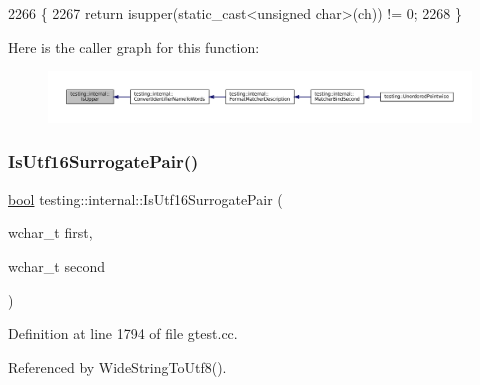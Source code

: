 \begin{DoxyCode}
2266                              \{
2267   \textcolor{keywordflow}{return} isupper(static\_cast<unsigned char>(ch)) != 0;
2268 \}
\end{DoxyCode}
Here is the caller graph for this function\+:
\nopagebreak
\begin{figure}[H]
\begin{center}
\leavevmode
\includegraphics[width=350pt]{namespacetesting_1_1internal_a84f3baa379fec6bf5947cb5165aa8cc9_icgraph}
\end{center}
\end{figure}
\mbox{\label{namespacetesting_1_1internal_a681895f8cc32286211be9889da107394}} 
\subsubsection{\texorpdfstring{Is\+Utf16\+Surrogate\+Pair()}{IsUtf16SurrogatePair()}}
{\footnotesize\ttfamily \hyperlink{classbool}{bool} testing\+::internal\+::\+Is\+Utf16\+Surrogate\+Pair (\begin{DoxyParamCaption}\item[{wchar\+\_\+t}]{first,  }\item[{wchar\+\_\+t}]{second }\end{DoxyParamCaption})\hspace{0.3cm}{\ttfamily [inline]}}



Definition at line 1794 of file gtest.\+cc.



Referenced by Wide\+String\+To\+Utf8().


